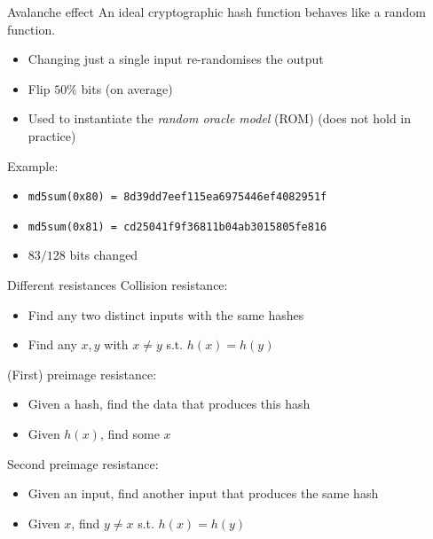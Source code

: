 \begin{frame}{Avalanche effect}
  An ideal cryptographic hash function behaves like a random function.
  \begin{itemize}[<+(1)->]
    \item Changing just a single input re-randomises the output
    \item Flip $50\%$ bits (on average)
    \item Used to instantiate the \emph{random oracle model} (ROM) (does not hold in practice)
  \end{itemize}

  \vspace*{1em}

  \pause
  Example:
  \begin{itemize}
    \item {\small\texttt{md5sum(0x80) = 8d39dd7eef115ea6975446ef4082951f}}
    \item {\small\texttt{md5sum(0x81) = cd25041f9f36811b04ab3015805fe816}}
    \pause\item $83/128$ bits changed
  \end{itemize}
\end{frame}

\begin{frame}{Different resistances}
  Collision resistance:
  \begin{itemize}[<+(1)->]
    \item Find any two distinct inputs with the same hashes
    \item Find any $x, y$ with $x \neq y$ s.t. $h(x) = h(y)$
  \end{itemize}

  \pause
  (First) preimage resistance:
  \begin{itemize}[<+(1)->]
    \item Given a hash, find the data that produces this hash
    \item Given $h(x)$, find some $x$
  \end{itemize}

  \pause
  Second preimage resistance:
  \begin{itemize}[<+(1)->]
    \item Given an input, find another input that produces the same hash
    \item Given $x$, find $y \neq x$ s.t. $h(x) = h(y)$
  \end{itemize}
\end{frame}

